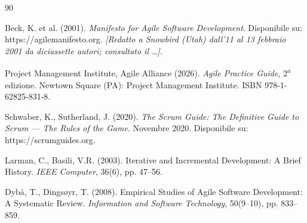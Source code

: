 \begin{thebibliography}{90}

 Beck, K. et al. (2001). \emph{Manifesto for Agile
  Software Development}. Disponibile su: https://agilemanifesto.org.
  \emph{[Redatto a Snowbird (Utah) dall'11 al 13 febbraio 2001 da diciassette
  autori; consultato il \ldots]}.

 Project Management Institute, Agile Alliance
  (2026). \emph{Agile Practice Guide}, 2\textsuperscript{a} edizione. Newtown
  Square (PA): Project Management Institute. ISBN 978-1-62825-831-8.

 Schwaber, K., Sutherland, J. (2020). \emph{The Scrum
  Guide: The Definitive Guide to Scrum --- The Rules of the Game}. Novembre
  2020. Disponibile su: https://scrumguides.org.

 Larman, C., Basili, V.R. (2003). Iterative and Incremental
  Development: A Brief History. \emph{IEEE Computer}, 36(6), pp. 47--56.

 Dyb\aa, T., Dings\o yr, T. (2008). Empirical Studies of Agile
  Software Development: A Systematic Review. \emph{Information and Software
  Technology}, 50(9--10), pp. 833--859.



\end{thebibliography}
